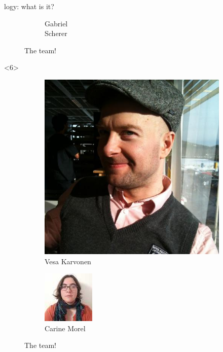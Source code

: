\begin{frame}{\Zoo[]logy: what is it?}
\begin{overbox}
\begin{figure}
\begin{subfigure}{0.25\textwidth}
            \caption*{\footnotesize Gabriel \\ Scherer}
        \end{subfigure}
        \caption*{The \Pstore team!}
    \end{figure}
\end{overbox}

\begin{overbox}<6>
    \begin{figure}
        \begin{subfigure}{0.4\textwidth}
            \includegraphics[scale=0.2]{images/vesa_karvonen.jpg}
            \caption*{\footnotesize Vesa Karvonen}
        \end{subfigure}
        \begin{subfigure}{0.4\textwidth}
            \includegraphics[scale=1]{images/carine_morel.jpg}
            \caption*{\footnotesize Carine Morel}
        \end{subfigure}
        \caption*{The \Saturn team!}
    \end{figure}
\end{overbox}


\end{frame}
